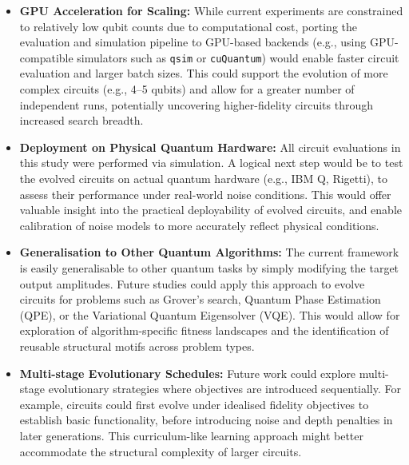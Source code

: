 \documentclass[11pt,a4paper]{article}
\begin{document}
\begin{itemize}
    \item \textbf{GPU Acceleration for Scaling:} While current experiments are constrained to relatively low qubit counts due to computational cost, porting the evaluation and simulation pipeline to GPU-based backends (e.g., using GPU-compatible simulators such as \texttt{qsim} or \texttt{cuQuantum}) would enable faster circuit evaluation and larger batch sizes. This could support the evolution of more complex circuits (e.g., 4–5 qubits) and allow for a greater number of independent runs, potentially uncovering higher-fidelity circuits through increased search breadth.
    
    \item \textbf{Deployment on Physical Quantum Hardware:} All circuit evaluations in this study were performed via simulation. A logical next step would be to test the evolved circuits on actual quantum hardware (e.g., IBM Q, Rigetti), to assess their performance under real-world noise conditions. This would offer valuable insight into the practical deployability of evolved circuits, and enable calibration of noise models to more accurately reflect physical conditions.

    \item \textbf{Generalisation to Other Quantum Algorithms:} The current framework is easily generalisable to other quantum tasks by simply modifying the target output amplitudes. Future studies could apply this approach to evolve circuits for problems such as Grover's search, Quantum Phase Estimation (QPE), or the Variational Quantum Eigensolver (VQE). This would allow for exploration of algorithm-specific fitness landscapes and the identification of reusable structural motifs across problem types.

    \item \textbf{Multi-stage Evolutionary Schedules:} Future work could explore multi-stage evolutionary strategies where objectives are introduced sequentially. For example, circuits could first evolve under idealised fidelity objectives to establish basic functionality, before introducing noise and depth penalties in later generations. This curriculum-like learning approach might better accommodate the structural complexity of larger circuits.
\end{itemize}


%
%
\end{document}
